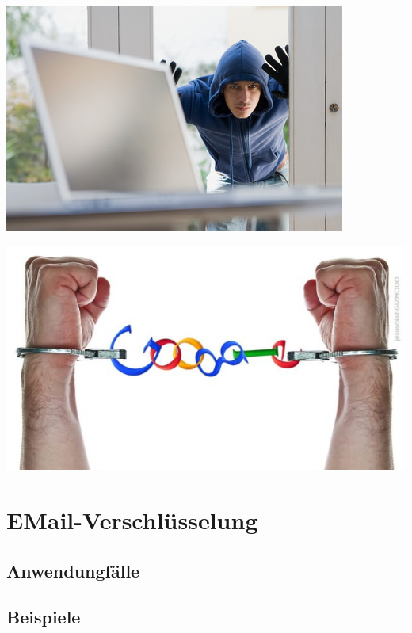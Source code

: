 \documentclass[xetex,mathserif,serif]{beamer}
\begin{document}
	\begin{frame}
	\includegraphics[scale=0.6]{./laptop_klau.jpg}
	\end{frame}
	
	\begin{frame}
	\includegraphics[scale=0.9]{./google.jpg}
	\end{frame}
	
	\begin{frame}
		\tableofcontents
	\end{frame}
	\section{EMail-Verschlüsselung}
	\subsection{Anwendungfälle}
		\begin{frame}
		
		\end{frame}
	\subsection{Beispiele}
		\begin{frame}
		\blindtext
		\end{frame}
\end{document}
